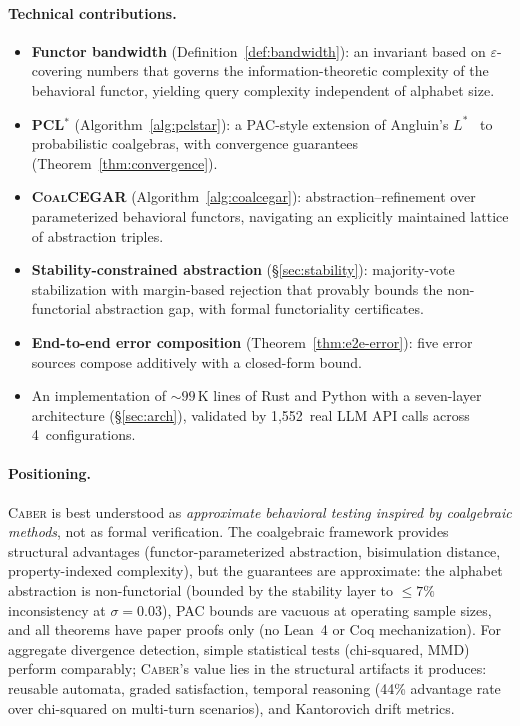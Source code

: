 \documentclass[11pt]{article}
\newcommand{\tool}{\textsc{Caber}}
\newcommand{\pclstar}{PCL$^*$}
\newcommand{\coalcegar}{\textsc{CoalCEGAR}}
\begin{document}
\paragraph{Technical contributions.}
\begin{itemize}[leftmargin=*,nosep]
\item \textbf{Functor bandwidth} (Definition~\ref{def:bandwidth}):
  an invariant based on $\varepsilon$-covering numbers that governs
  the information-theoretic complexity of the behavioral functor,
  yielding query complexity independent of alphabet size.
\item \textbf{\pclstar{}} (Algorithm~\ref{alg:pclstar}): a PAC-style
  extension of Angluin's $L^*$~\cite{angluin1987learning} to
  probabilistic coalgebras, with convergence guarantees
  (Theorem~\ref{thm:convergence}).
\item \textbf{\coalcegar{}} (Algorithm~\ref{alg:coalcegar}):
  abstraction--refinement over parameterized behavioral functors,
  navigating an explicitly maintained lattice of abstraction triples.
\item \textbf{Stability-constrained abstraction}
  (\S\ref{sec:stability}): majority-vote stabilization with
  margin-based rejection that provably bounds the non-functorial
  abstraction gap, with formal functoriality certificates.
\item \textbf{End-to-end error composition}
  (Theorem~\ref{thm:e2e-error}): five error sources compose
  additively with a closed-form bound.
\item An implementation of ${\sim}99$\,K lines of Rust and Python
  with a seven-layer architecture (\S\ref{sec:arch}), validated
  by 1{,}552~real LLM API calls across 4~configurations.
\end{itemize}

\paragraph{Positioning.}
\tool{} is best understood as \emph{approximate behavioral testing
inspired by coalgebraic methods}, not as formal verification.
The coalgebraic framework provides structural advantages
(functor-parameterized abstraction, bisimulation distance,
property-indexed complexity), but the guarantees are approximate:
the alphabet abstraction is non-functorial (bounded by the stability
layer to ${\le}7\%$ inconsistency at $\sigma{=}0.03$),
PAC bounds are vacuous at operating sample sizes, and all theorems
have paper proofs only (no Lean~4 or Coq mechanization).  For
aggregate divergence detection, simple statistical tests (chi-squared,
MMD) perform comparably; \tool{}'s value lies in the structural
artifacts it produces: reusable automata, graded satisfaction,
temporal reasoning (44\% advantage rate over chi-squared on multi-turn
scenarios), and Kantorovich drift metrics.
\end{document}
